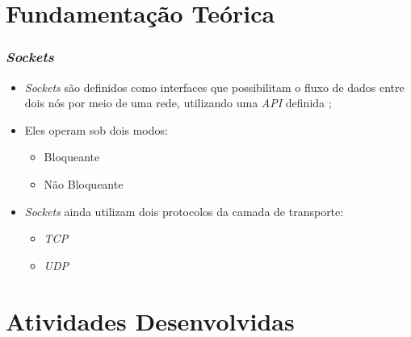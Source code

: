 \documentclass{beamer}
\begin{document}
\section{Fundamentação Teórica}

\begin{frame} \frametitle{\emph{Sockets}}
\begin{itemize}
	\item \justifying \emph{Sockets} são definidos como interfaces que possibilitam o fluxo de dados entre dois nós por meio de uma rede, utilizando uma \emph{API} definida \cite{Tanenbaum};
	\item Eles operam sob dois modos:
	\begin{itemize}
		\item Bloqueante
		\item Não Bloqueante
	\end{itemize}
	\item \justifying \emph{Sockets} ainda utilizam dois protocolos da camada de transporte:
	\begin{itemize}
		\item \emph{TCP}
		\item \emph{UDP}
	\end{itemize}
\end{itemize}
\end{frame}

\section{Atividades Desenvolvidas}
\end{document}
